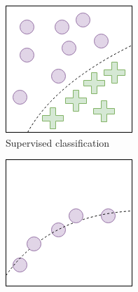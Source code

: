 \begin{figure}
     \centering
     \begin{subfigure}[t]{0.34\textwidth}
         \centering
         \includegraphics[width=\textwidth]{background/figures/supervised_classification.png}
         \caption{Supervised classification}
         \label{fig:supervised_calssification}
     \end{subfigure}
     \hspace{15px}
     \begin{subfigure}[t]{0.34\textwidth}
         \centering
         \includegraphics[width=\textwidth]{background/figures/supervised_regression.png}

\end{subfigure}
\end{figure}
